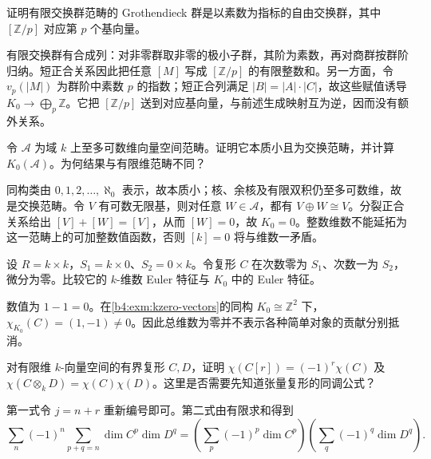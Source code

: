 \begin{exercise}\label{b4:ex:05-finite-groups-kzero}
证明有限交换群范畴的 Grothendieck 群是以素数为指标的自由交换群，其中 \([\mathbb Z/p]\) 对应第 \(p\) 个基向量。
\end{exercise}
\begin{solution}
有限交换群有合成列：对非零群取非零的极小子群，其阶为素数，再对商群按群阶归纳。短正合关系因此把任意 \([M]\) 写成 \([\mathbb Z/p]\) 的有限整数和。另一方面，令 \(v_p(|M|)\) 为群阶中素数 \(p\) 的指数；短正合列满足 \(|B|=|A|\cdot|C|\)，故这些赋值诱导 \(K_0\to\bigoplus_p\mathbb Z\)。它把 \([\mathbb Z/p]\) 送到对应基向量，与前述生成映射互为逆，因而没有额外关系。
\end{solution}

\begin{exercise}\label{b4:ex:05-countable-swindle}
令 \(\mathcal A\) 为域 \(k\) 上至多可数维向量空间范畴。证明它本质小且为交换范畴，并计算 \(K_0(\mathcal A)\)。为何结果与有限维范畴不同？
\end{exercise}
\begin{solution}
同构类由 \(0,1,2,\ldots,\aleph_0\) 表示，故本质小；核、余核及有限双积仍至多可数维，故是交换范畴。令 \(V\) 有可数无限基，则对任意 \(W\in\mathcal A\)，都有 \(V\oplus W\cong V\)。分裂正合关系给出 \([V]+[W]=[V]\)，从而 \([W]=0\)，故 \(K_0=0\)。整数维数不能延拓为这一范畴上的可加整数值函数，否则 \([k]=0\) 将与维数一矛盾。
\end{solution}

\begin{exercise}\label{b4:ex:05-kzero-more-than-dimension}
设 \(R=k\times k\)，\(S_1=k\times0\)、\(S_2=0\times k\)。令复形 \(C\) 在次数零为 \(S_1\)、次数一为 \(S_2\)，微分为零。比较它的 \(k\)-维数 Euler 特征与 \(K_0\) 中的 Euler 特征。
\end{exercise}
\begin{solution}
数值为 \(1-1=0\)。在\cref{b4:exm:kzero-vectors}的同构 \(K_0\cong\mathbb Z^2\) 下，\(\chi_{K_0}(C)=(1,-1)\ne0\)。因此总维数为零并不表示各种简单对象的贡献分别抵消。
\end{solution}

\begin{exercise}\label{b4:ex:05-euler-shift-tensor}
对有限维 \(k\)-向量空间的有界复形 \(C,D\)，证明 \(\chi(C[r])=(-1)^r\chi(C)\) 及 \(\chi(C\otimes_kD)=\chi(C)\chi(D)\)。这里是否需要先知道张量复形的同调公式？
\end{exercise}
\begin{solution}
第一式令 \(j=n+r\) 重新编号即可。第二式由有限求和得到
\[
\sum_n(-1)^n\sum_{p+q=n}\dim C^p\dim D^q
=\left(\sum_p(-1)^p\dim C^p\right)
 \left(\sum_q(-1)^q\dim D^q\right).
\]

\end{solution}

